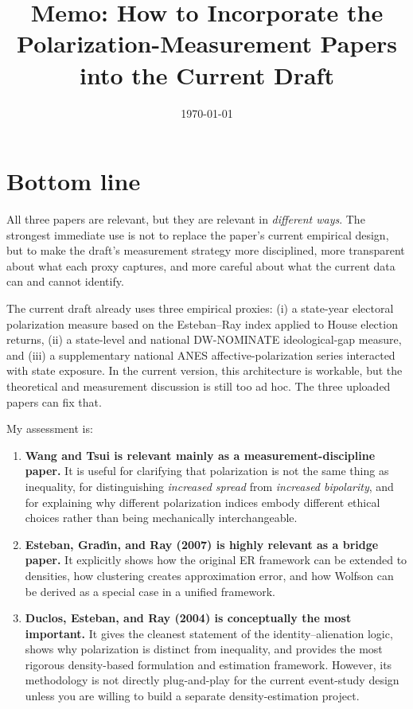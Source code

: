 \documentclass[12pt]{article}
\title{Memo: How to Incorporate the Polarization-Measurement Papers into the Current Draft}
\author{}
\date{\today}
\begin{document}
\maketitle

\section*{Bottom line}
All three papers are relevant, but they are relevant in \emph{different ways}. The strongest immediate use is not to replace the paper's current empirical design, but to make the draft's measurement strategy more disciplined, more transparent about what each proxy captures, and more careful about what the current data can and cannot identify.

The current draft already uses three empirical proxies: (i) a state-year electoral polarization measure based on the Esteban--Ray index applied to House election returns, (ii) a state-level and national DW-NOMINATE ideological-gap measure, and (iii) a supplementary national ANES affective-polarization series interacted with state exposure. In the current version, this architecture is workable, but the theoretical and measurement discussion is still too ad hoc. The three uploaded papers can fix that.

My assessment is:
\begin{enumerate}[label=\arabic*.]
    \item \textbf{Wang and Tsui is relevant mainly as a measurement-discipline paper.} It is useful for clarifying that polarization is not the same thing as inequality, for distinguishing \emph{increased spread} from \emph{increased bipolarity}, and for explaining why different polarization indices embody different ethical choices rather than being mechanically interchangeable.
    \item \textbf{Esteban, Grad\'{\i}n, and Ray (2007) is highly relevant as a bridge paper.} It explicitly shows how the original ER framework can be extended to densities, how clustering creates approximation error, and how Wolfson can be derived as a special case in a unified framework.
    \item \textbf{Duclos, Esteban, and Ray (2004) is conceptually the most important.} It gives the cleanest statement of the identity--alienation logic, shows why polarization is distinct from inequality, and provides the most rigorous density-based formulation and estimation framework. However, its methodology is not directly plug-and-play for the current event-study design unless you are willing to build a separate density-estimation project.
\end{enumerate}
\end{document}
